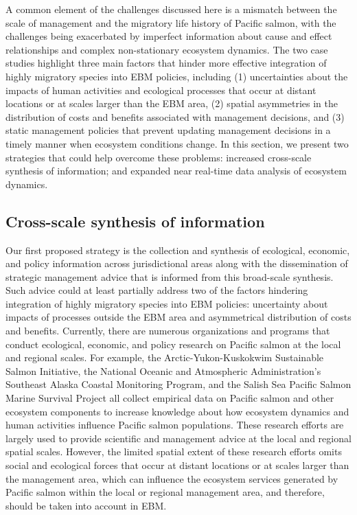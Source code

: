 A common element of the challenges discussed here is a mismatch between the
scale of management and the migratory life history of Pacific salmon, with the
challenges being exacerbated by imperfect information about cause and effect
relationships and complex non-stationary ecosystem dynamics. The two case
studies highlight three main factors that hinder more effective integration of
highly migratory species into EBM policies, including (1) uncertainties about
the impacts of human activities and ecological processes that occur at distant
locations or at scales larger than the EBM area, (2) spatial asymmetries in the
distribution of costs and benefits associated with management decisions, and (3)
static management policies that prevent updating management decisions in a
timely manner when ecosystem conditions change. In this section, we present two
strategies that could help overcome these problems: increased cross-scale
synthesis of information; and expanded near real-time data analysis of ecosystem
dynamics.


\subsection{Cross-scale synthesis of information}

Our first proposed strategy is the collection and synthesis of ecological,
economic, and policy information across jurisdictional areas along with the
dissemination of strategic management advice that is informed from this
broad-scale synthesis. Such advice could at least partially address two of the
factors hindering integration of highly migratory species into EBM policies:
uncertainty about impacts of processes outside the EBM area and asymmetrical
distribution of costs and benefits. Currently, there are numerous organizations
and programs that conduct ecological, economic, and policy research on Pacific
salmon at the local and regional scales. For example, the Arctic-Yukon-Kuskokwim
Sustainable Salmon Initiative, the National Oceanic and Atmospheric
Administration's Southeast Alaska Coastal Monitoring Program, and the Salish Sea
Pacific Salmon Marine Survival Project all collect empirical data on Pacific
salmon and other ecosystem components to increase knowledge about how ecosystem
dynamics and human activities influence Pacific salmon populations. These
research efforts are largely used to provide scientific and management advice at
the local and regional spatial scales. However, the limited spatial extent of
these research efforts omits social and ecological forces that occur at distant
locations or at scales larger than the management area, which can influence the
ecosystem services generated by Pacific salmon within the local or regional
management area, and therefore, should be taken into account in EBM.

